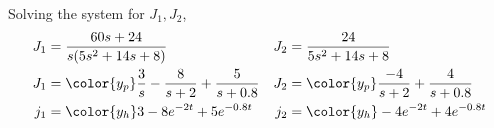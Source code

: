 \begin{enumerate}
\begin{enumerate}
                    Solving the system for $ J_1, J_2 $,
                    \begin{align}
                        J_1                 & = \frac{60s + 24}{s(5s^2 + 14s + 8)} &
                        J_2                 & = \frac{24}{5s^2 + 14s + 8}            \\
                        J_1                 & = \color{y_p} \frac{3}{s}
                        - \frac{8}{s + 2}
                        + \frac{5}{s + 0.8} &
                        J_2                 & = \color{y_p}  \frac{-4}{s + 2}
                        + \frac{4}{s + 0.8}                                          \\
                        j_1                 & = \color{y_h} 3 - 8e^{-2t}
                        + 5e^{-0.8t}        &
                        j_2                 & = \color{y_h} -4e^{-2t} + 4e^{-0.8t}
                    \end{align}


\end{enumerate}
\end{enumerate}
